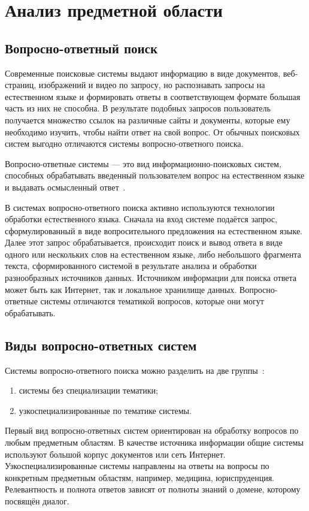 \chapter{Анализ предметной области}

\section{Вопросно-ответный поиск}
Современные поисковые системы выдают информацию в виде документов, веб-страниц, изображений и видео по запросу, но распознавать запросы на естественном языке и формировать ответы в соответствующем формате большая часть из них не способна. В результате подобных запросов пользователь получается множество ссылок на различные сайты и документы, которые ему необходимо изучить, чтобы найти ответ на свой вопрос. От обычных поисковых систем выгодно отличаются системы вопросно-ответного поиска.

Вопросно-ответные системы --- это вид информационно-поисковых систем, способных обрабатывать введенный пользователем вопрос на естественном языке и выдавать осмысленный ответ~\cite{class1}.

В системах вопросно-ответного поиска активно используются технологии обработки естественного языка. Сначала на вход системе подаётся запрос, сформулированный в виде вопросительного предложения на естественном языке. Далее этот запрос обрабатывается, происходит поиск и вывод ответа в виде одного или нескольких слов на естественном языке, либо небольшого фрагмента текста, сформированного системой в результате анализа и обработки разнообразных источников данных. Источником информации для поиска ответа может быть как Интернет, так и локальное хранилище данных. Вопросно-ответные системы отличаются тематикой вопросов, которые они могут обрабатывать.

\section{Виды вопросно-ответных систем}
Системы вопросно-ответного поиска можно разделить на две группы~\cite{art1}: 
\begin{enumerate}
	\item системы без специализации тематики;
	\item узкоспециализированные по тематике системы.
\end{enumerate}

Первый вид вопросно-ответных систем ориентирован на обработку вопросов по любым предметным областям. В качестве источника информации общие системы используют большой корпус документов или сеть Интернет.
Узкоспециализированные системы направлены на ответы на вопросы по конкретным предметным областям, например, медицина, юриспруденция. Релевантность и полнота ответов зависят от полноты знаний о домене, которому посвящён диалог.

